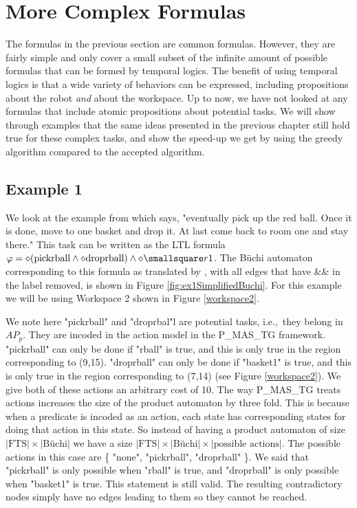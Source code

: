 \chapter{More Complex Formulas}
The formulas in the previous section are common formulas. However, they are fairly simple and only cover a small subset of the infinite amount of possible formulas that can be formed by temporal logics. The benefit of using temporal logics is that a wide variety of behaviors can be expressed, including propositions about the robot \textit{and} about the workspace. Up to now, we have not looked at any formulas that include atomic propositions about potential tasks. We will show through examples that the same ideas presented in the previous chapter still hold true for these complex tasks, and show the speed-up we get by using the greedy algorithm compared to the accepted algorithm. 

\section{Example 1}
We look at the example from \cite{guo15} which says, "eventually pick up the red ball. Once it is done, move to one basket and drop it. At last come back to room one and stay there." This task can be written as the LTL formula $\varphi = \diamond (\text{pickrball} \wedge \diamond \text{droprball}) \wedge \diamond \smallsquare r1$. The B\"uchi automaton corresponding to this formula as translated by \cite{ltlbuchiwebsite}, with all edges that have \&\& in the label removed, is shown in Figure \ref{fig:ex1SimplifiedBuchi}. For this example we will be using Workspace 2 shown in Figure \ref{workspace2}.

We note here "pickrball" and "droprbal"l are potential tasks, i.e.,\ they belong in $AP_p$. They are incoded in the action model in the P\_MAS\_TG framework. "pickrball" can only be done if "rball" is true, and this is only true in the region corresponding to (9,15).  "droprball" can only be done if "basket1" is true, and this is only true in the region corresponding to (7,14) (see Figure \ref{workspace2}). We give both of these actions an arbitrary cost of 10. The way P\_MAS\_TG treats actions increases the size of the product automaton by three fold. This is because when a predicate is incoded as an action, each state has corresponding states for doing that action in this state. So instead of having a product automaton of size $|\text{FTS}| \times |\text{B\"uchi}| $ we have a size $|\text{FTS}| \times |\text{B\"uchi}| \times |\text{possible actions}|$. The possible actions in this case are \{ "none", "pickrball", "droprball" \}. We said that "pickrball" is only possible when "rball" is true, and "droprball" is only possible when "basket1" is true. This statement is still valid. The resulting contradictory nodes simply have no edges leading to them so they cannot be reached. 


